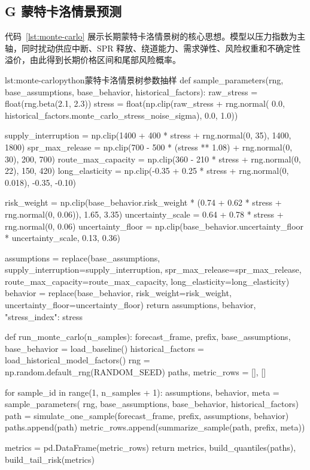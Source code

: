 \subsection*{G 蒙特卡洛情景预测}

代码~\ref{lst:monte-carlo} 展示长期蒙特卡洛情景树的核心思想。模型以压力指数为主轴，同时扰动供应中断、SPR 释放、绕道能力、需求弹性、风险权重和不确定性溢价，由此得到长期价格区间和尾部风险概率。

\begin{paperlisting}{lst:monte-carlo}{python}{蒙特卡洛情景树参数抽样}
def sample_parameters(rng, base_assumptions, base_behavior, historical_factors):
    raw_stress = float(rng.beta(2.1, 2.3))
    stress = float(np.clip(raw_stress + rng.normal(
        0.0, historical_factors.monte_carlo_stress_noise_sigma), 0.0, 1.0))

    supply_interruption = np.clip(1400 + 400 * stress + rng.normal(0, 35), 1400, 1800)
    spr_max_release = np.clip(700 - 500 * (stress ** 1.08) + rng.normal(0, 30), 200, 700)
    route_max_capacity = np.clip(360 - 210 * stress + rng.normal(0, 22), 150, 420)
    long_elasticity = np.clip(-0.35 + 0.25 * stress + rng.normal(0, 0.018),
                              -0.35, -0.10)

    risk_weight = np.clip(base_behavior.risk_weight * (0.74 + 0.62 * stress
                                                       + rng.normal(0, 0.06)),
                          1.65, 3.35)
    uncertainty_scale = 0.64 + 0.78 * stress + rng.normal(0, 0.06)
    uncertainty_floor = np.clip(base_behavior.uncertainty_floor * uncertainty_scale,
                                0.13, 0.36)

    assumptions = replace(base_assumptions,
                          supply_interruption=supply_interruption,
                          spr_max_release=spr_max_release,
                          route_max_capacity=route_max_capacity,
                          long_elasticity=long_elasticity)
    behavior = replace(base_behavior,
                       risk_weight=risk_weight,
                       uncertainty_floor=uncertainty_floor)
    return assumptions, behavior, {"stress_index": stress}

def run_monte_carlo(n_samples):
    forecast_frame, prefix, base_assumptions, base_behavior = load_baseline()
    historical_factors = load_historical_model_factors()
    rng = np.random.default_rng(RANDOM_SEED)
    paths, metric_rows = [], []

    for sample_id in range(1, n_samples + 1):
        assumptions, behavior, meta = sample_parameters(
            rng, base_assumptions, base_behavior, historical_factors)
        path = simulate_one_sample(forecast_frame, prefix, assumptions, behavior)
        paths.append(path)
        metric_rows.append(summarize_sample(path, prefix, meta))

    metrics = pd.DataFrame(metric_rows)
    return metrics, build_quantiles(paths), build_tail_risk(metrics)
\end{paperlisting}

\clearpage
